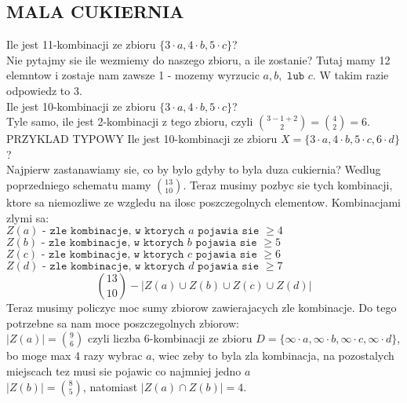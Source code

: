 \documentclass{article}
\begin{document}
\subsection*{MALA CUKIERNIA}
    \color{acc}Ile jest 11-kombinacji ze zbioru $\{3\cdot a, 4\cdot b, 5\cdot c\}$?\color{txt}\smallskip\\
    Nie pytajmy sie ile wezmiemy do naszego zbioru, a ile zostanie? Tutaj mamy 12 elemntow i zostaje nam zawsze 1 - mozemy wyrzucic $a,b,\texttt{ lub }c$. W takim razie odpowiedz to \color{emp}3\color{txt}.\medskip\\
    \color{acc}Ile jest 10-kombinacji ze zbioru $\{3\cdot a, 4\cdot b, 5\cdot c\}$?\color{txt}\smallskip\\
    Tyle samo, ile jest 2-kombinacji z tego zbioru, czyli ${3-1+2\choose2}={4\choose2}=6$.\medskip\\
    \color{def}PRZYKLAD TYPOWY \color{acc}Ile jest 10-kombinacji ze zbioru $X=\{3\cdot a, 4\cdot b, 5\cdot c, 6\cdot d\}$?\color{txt}\smallskip\\
    Najpierw zastanawiamy sie, co by bylo gdyby to byla duza cukiernia? Wedlug poprzedniego schematu mamy ${13\choose10}$. Teraz musimy pozbyc sie tych kombinacji, ktore sa niemozliwe ze wzgledu na ilosc poszczegolnych elementow. Kombinacjami zlymi sa:\\
    $Z(a)\texttt{ - zle kombinacje, w ktorych }a\texttt{ pojawia sie }\geq 4$\\
    $Z(b)\texttt{ - zle kombinacje, w ktorych }b\texttt{ pojawia sie }\geq 5$\\
    $Z(c)\texttt{ - zle kombinacje, w ktorych }c\texttt{ pojawia sie }\geq 6$\\
    $Z(d)\texttt{ - zle kombinacje, w ktorych }d\texttt{ pojawia sie }\geq 7$\\
    $${13\choose10}-|Z(a)\cup Z(b)\cup Z(c)\cup Z(d)|$$
    Teraz musimy policzyc moc sumy zbiorow zawierajacych zle kombinacje. Do tego potrzebne sa nam moce poszczegolnych zbiorow:\\
    $|Z(a)|={9\choose6}$ czyli liczba 6-kombinacji ze zbioru $D=\{\infty\cdot a, \infty\cdot b, \infty\cdot c, \infty\cdot d\}$, bo moge max 4 razy wybrac $a$, wiec zeby to byla zla kombinacja, na pozostalych miejscach tez musi sie pojawic co najmniej jedno $a$\\
    $|Z(b)|={8\choose5}$, natomiast $|Z(a)\cap Z(b)|=4$.
\end{document}

